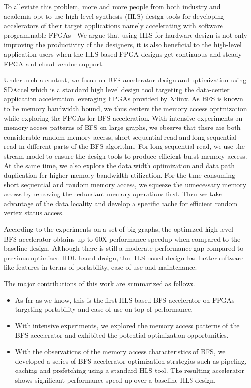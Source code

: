 To alleviate this problem, more and more people from both industry and 
academia opt to use high level synthesis (HLS) design tools for 
developing accelerators of their target applications namely 
accelerating with software programmable FPGAs \cite{koch2016fpgas}. 
We argue that using HLS for hardware design is not only improving 
the productivity of the designers, it is also 
beneficial to the high-level application users when the HLS based 
FPGA designs get continuous and steady FPGA and cloud vendor support.

Under such a context, we focus on BFS accelerator design and 
optimization using SDAccel which is a standard high level design tool targeting 
the data-center application acceleration leveraging FPGAs provided by Xilinx. 
As BFS is known to be memory bandwidth bound, we thus centers the memory 
access optimization while exploring the FPGAs for BFS acceleration. With intensive 
experiments on memory access patterns of BFS on large graphs, we observe 
that there are both considerable random memory access, short sequential read 
and long sequential read in different parts of the BFS algorithm. 
For long sequential read, we use the stream model to ensure the design 
tools to produce efficient burst memory access. At the same time, we also
explore the data width optimization and data path duplication 
for higher memory bandwidth utilization. For the time-consuming 
short sequential and random memory access, we squeeze the 
unnecessary memory access by removing the redundant memory operations first. 
Then we take advantage of the data locality and develop a specific cache for 
efficient random vertex status access. 

According to the experiments on a set of big graphs, the optimized high level BFS 
accelerator obtains up to 60X performance speedup when compared to the baseline 
design. Although there is still a moderate performance gap compared to previous 
optimized HDL based design, the HLS based design has better software-like features 
in terms of portability, ease of use and maintenance.

The major contributions of this work are summarized as follows.
\begin{itemize}
    \item As far as we know, this is the first HLS based BFS accelerator on 
        FPGAs targeting portability and ease of use on top of performance. 
    \item With intensive experiments, we explored the memory access 
        patterns of the BFS accelerator and exhibited the potential 
        optimization opportunities.
    \item With the observations of the memory access characteristics of BFS, we 
        developed a series of BFS accelerator optimization strategies such 
        as pipeling, caching and prefetching using a standard HLS tool.
        The resulting accelerator shows significant performance speed up 
        over a baseline HLS design.
\end{itemize}

